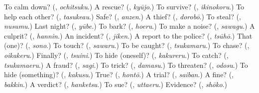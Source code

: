 \begin{tcolorbox}[breakable,colback=teal!4,colframe=teal!35!black,title={Before you move on}]
To calm down? (\textbf{}, \emph{ochitsuku}.) A rescue? (\textbf{}, \emph{kyūjo}.) To survive? (\textbf{}, \emph{ikinokoru}.) To help each other? (\textbf{}, \emph{tasukeau}.) Safe? (\textbf{}, \emph{anzen}.) A thief? (\textbf{}, \emph{dorobō}.) To steal? (\textbf{}, \emph{nusumu}.) Last night? (\textbf{}, \emph{yūbe}.) To bark? (\textbf{}, \emph{hoeru}.) To make a noise? (\textbf{}, \emph{sawagu}.) A culprit? (\textbf{}, \emph{hannin}.) An incident? (\textbf{}, \emph{jiken}.) A report to the police? (\textbf{}, \emph{tsūhō}.) That (one)? (\textbf{}, \emph{sono}.) To touch? (\textbf{}, \emph{sawaru}.) To be caught? (\textbf{}, \emph{tsukamaru}.) To chase? (\textbf{}, \emph{oikakeru}.) Finally? (\textbf{}, \emph{tsuini}.) To hide (oneself)? (\textbf{}, \emph{kakureru}.) To catch? (\textbf{}, \emph{tsukamaeru}.) A fraud? (\textbf{}, \emph{sagi}.) To trick? (\textbf{}, \emph{damasu}.) To threaten? (\textbf{}, \emph{odosu}.) To hide (something)? (\textbf{}, \emph{kakusu}.) True? (\textbf{}, \emph{hontō}.) A trial? (\textbf{}, \emph{saiban}.) A fine? (\textbf{}, \emph{bakkin}.) A verdict? (\textbf{}, \emph{hanketsu}.) To sue? (\textbf{}, \emph{uttaeru}.) Evidence? (\textbf{}, \emph{shōko}.)
\end{tcolorbox}
